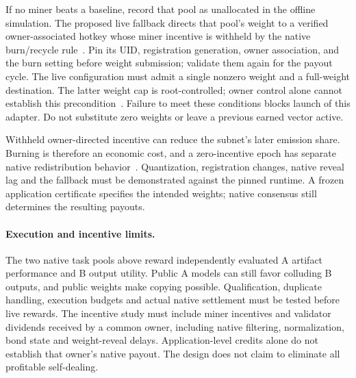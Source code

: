 If no miner beats a baseline, record that pool as unallocated in the
offline simulation. The proposed live fallback directs that pool's
weight to a verified owner-associated hotkey whose miner incentive is
withheld by the native burn/recycle rule~\cite{btmining}. Pin its UID,
registration generation, owner association, and the burn setting before
weight submission; validate them again for the payout cycle. The live
configuration must admit a single nonzero weight and a full-weight
destination. The latter weight cap is root-controlled; owner control
alone cannot establish this precondition~\cite{btweightlimits}.
Failure to meet these conditions blocks launch of this adapter. Do not
substitute zero weights or leave a previous earned vector active.

Withheld owner-directed incentive can reduce the subnet's later emission
share. Burning is therefore an economic cost, and a zero-incentive epoch
has separate native redistribution behavior~\cite{btemissions}.
Quantization, registration changes, native reveal lag and the fallback
must be demonstrated against the pinned runtime. A frozen application
certificate specifies the intended weights; native consensus still
determines the resulting payouts.

\paragraph{Execution and incentive limits.}
The two native task pools above reward
independently evaluated A artifact performance and B output utility.
Public A models can still favor colluding B outputs, and public weights
make copying possible. Qualification, duplicate handling, execution
budgets and actual native settlement must be tested before live rewards.
The incentive study must include miner incentives and validator dividends
received by a common owner, including native filtering, normalization,
bond state and weight-reveal delays. Application-level credits alone
do not establish that owner's native payout.
The design does not claim to eliminate all profitable self-dealing.
